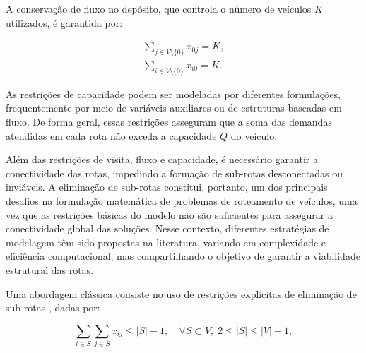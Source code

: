 
A conservação de fluxo no depósito, que controla o número de veículos $K$ utilizados, é garantida por:

\begin{eqnarray}
\sum_{j \in V \setminus \{0\}} x_{0j} = K, \\[4pt]
\sum_{i \in V \setminus \{0\}} x_{i0} = K.
\end{eqnarray}

As restrições de capacidade podem ser modeladas por diferentes formulações, frequentemente por meio de variáveis auxiliares ou de estruturas baseadas em fluxo. De forma geral, essas restrições asseguram que a soma das demandas atendidas em cada rota não exceda a capacidade $Q$ do veículo.

Além das restrições de visita, fluxo e capacidade, é necessário garantir a conectividade das rotas, impedindo a formação de sub-rotas desconectadas ou inviáveis. A eliminação de sub-rotas constitui, portanto, um dos principais desafios na formulação matemática de problemas de roteamento de veículos, uma vez que as restrições básicas do modelo não são suficientes para assegurar a conectividade global das soluções. Nesse contexto, diferentes estratégias de modelagem têm sido propostas na literatura, variando em complexidade e eficiência computacional, mas compartilhando o objetivo de garantir a viabilidade estrutural das rotas.

Uma abordagem clássica consiste no uso de restrições explícitas de eliminação de sub-rotas \cite{dantzig2009solution}, dadas por:

\begin{equation}
\sum_{i \in S} \sum_{j \in S} x_{ij} \leq |S| - 1, 
\quad \forall S \subset V,\; 2 \leq |S| \leq |V|-1,
\end{equation}


